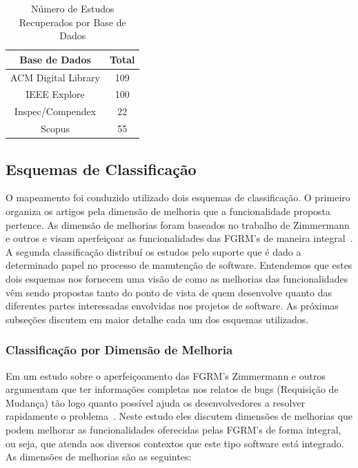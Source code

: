 \begin{table}[htb] \centering \caption{Número de Estudos Recuperados por Base de
		Dados}\label{tab:estudos-por-base-dados} \begin{tabular}{cc} \hline
		\textbf{Base de Dados} & \textbf{Total} \\ \hline ACM Digital Library
		& 109            \\ IEEE Explore           & 100            \\
		Inspec/Compendex       & 22             \\ Scopus                 & 55
		\\ \hline \end{tabular}

\end{table}

\subsection{Esquemas de Classificação}
\label{subsec:map-esquemas-classificacao}

O mapeamento foi conduzido utilizado dois esquemas de classificação. O primeiro
organiza os artigos pela dimensão de melhoria que a funcionalidade proposta
pertence. As dimensão de melhorias foram baseados no trabalho de Zimmermann e
outros e visam aperfeiçoar as funcionalidades das FGRM's de maneira
integral~\cite{zimmermann2009improving}. A segunda classificação distribuí os
estudos pelo suporte que é dado a determinado papel no processo de manutenção de
software. Entendemos que estes dois esquemas nos fornecem uma visão de como as
melhorias das funcionalidades vêm sendo propostas tanto do ponto de vista de
quem desenvolve quanto das diferentes partes interessadas envolvidas nos
projetos de software. As pró\-xi\-mas subseções discutem em maior detalhe cada um
dos esquemas utilizados.

\subsubsection{Classificação por Dimensão de Melhoria}
\label{subsubsec:map-esquema-suporte-problema}

Em um estudo sobre o aperfeiçoamento das FGRM's Zimmermann e outros argumentam
que ter informações completas nos relatos de bugs (Requisição de Mudança) tão
logo quanto possível ajuda os desenvolvedores a resolver rapidamente o
problema~\cite{zimmermann2009improving}. Neste estudo eles discutem dimensões de
melhorias que podem melhorar as funcionalidades oferecidas pelas FGRM's de forma
integral, ou seja, que atenda aos diversos contextos que este tipo software está
integrado. As dimensões de melhorias são as seguintes:

